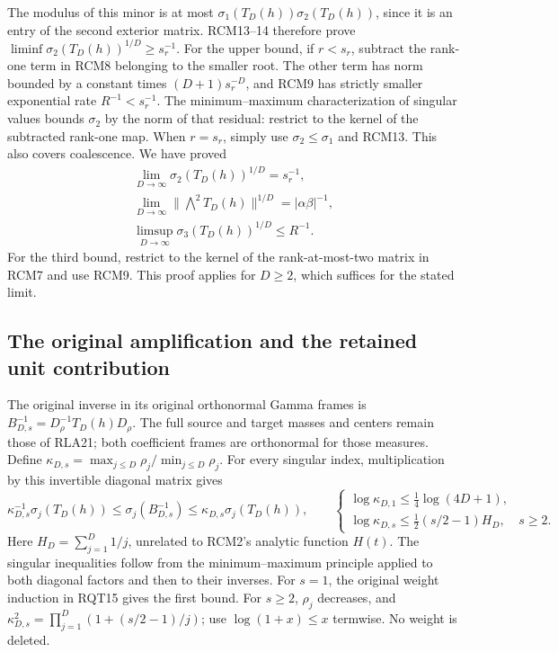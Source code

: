 \documentclass[11pt]{article}
\begin{document}
The modulus of this minor is at most
$\sigma_1(T_D(h))\sigma_2(T_D(h))$, since it is an entry
of the second exterior matrix.  RCM13--14 therefore prove
$\liminf\sigma_2(T_D(h))^{1/D}\ge s_r^{-1}$.
For the upper bound, if $r<s_r$, subtract the rank-one term
in RCM8 belonging to the smaller root.  The other term has
norm bounded by a constant times $(D+1)s_r^{-D}$, and RCM9
has strictly smaller exponential rate $R^{-1}<s_r^{-1}$.
The minimum--maximum characterization of singular values bounds
$\sigma_2$ by the norm of that residual: restrict to the kernel
of the subtracted rank-one map.  When $r=s_r$, simply use
$\sigma_2\le\sigma_1$ and RCM13.  This also covers coalescence.
We have proved
\[
 \begin{gathered}
 \lim_{D\to\infty}\sigma_2(T_D(h))^{1/D}=s_r^{-1},\\
 \lim_{D\to\infty}\|\bigwedge^2T_D(h)\|^{1/D}
          =|\alpha\beta|^{-1},\\
 \limsup_{D\to\infty}\sigma_3(T_D(h))^{1/D}\le R^{-1}.
 \end{gathered}\tag{RCM15}
\]
For the third bound, restrict to the kernel of the rank-at-most-two
matrix in RCM7 and use RCM9.  This proof applies for $D\ge2$,
which suffices for the stated limit.

\subsection{The original amplification and the retained unit contribution}
The original inverse in its original orthonormal Gamma frames is
$B_{D,s}^{-1}=D_\rho^{-1}T_D(h)D_\rho$.
The full source and target masses and centers remain those of
RLA21; both coefficient frames are orthonormal for those measures.
Define $\kappa_{D,s}=\max_{j\le D}\rho_j/\min_{j\le D}\rho_j$.
For every singular index, multiplication by this invertible
diagonal matrix gives
\[
 \kappa_{D,s}^{-1}\sigma_j(T_D(h))\le
 \sigma_j(B_{D,s}^{-1})\le
 \kappa_{D,s}\sigma_j(T_D(h)),\qquad
 \begin{cases}
 \log\kappa_{D,1}\le\tfrac14\log(4D+1),\\
 \log\kappa_{D,s}\le\tfrac12(s/2-1)H_D,&s\ge2.
 \end{cases}
 \tag{RCM16}
\]
Here $H_D=\sum_{j=1}^D1/j$, unrelated to RCM2's analytic
function $H(t)$.  The singular inequalities follow from the
minimum--maximum principle applied to both diagonal factors
and then to their inverses.  For $s=1$, the original weight
induction in RQT15 gives the first bound.  For $s\ge2$,
$\rho_j$ decreases, and
$\kappa_{D,s}^2=\prod_{j=1}^D(1+(s/2-1)/j)$;
use $\log(1+x)\le x$ termwise.  No weight is deleted.
\end{document}
